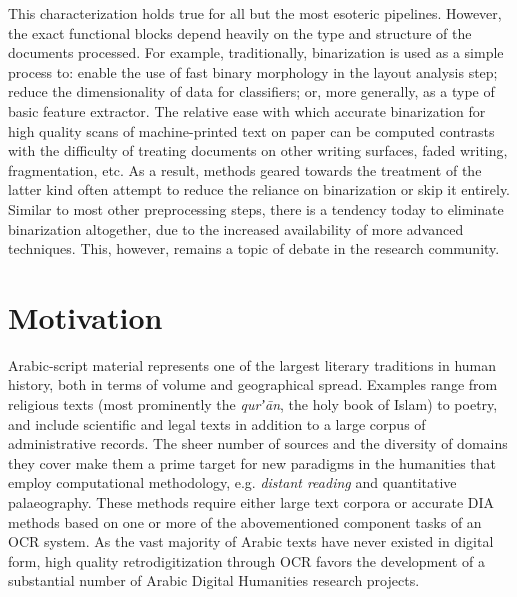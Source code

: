 This characterization holds true for all but the most esoteric pipelines.
However, the exact functional blocks depend heavily on the type and structure
of the documents processed. For example, traditionally, binarization is used as
a simple process to: enable the use of fast binary morphology in the layout
analysis step; reduce the dimensionality of data for classifiers; or, more
generally, as a type of basic feature extractor. The relative ease with which
accurate binarization for high quality scans of machine-printed text on paper
can be computed contrasts with the difficulty of treating documents on other
writing surfaces, faded writing, fragmentation, etc. As a result, methods
geared towards the treatment of the latter kind often attempt to reduce the
reliance on binarization or skip it entirely. Similar to most other
preprocessing steps, there is a tendency today to eliminate binarization
altogether, due to the increased availability of more advanced techniques.
This, however, remains a topic of debate in the research community.

\section{Motivation}

Arabic-script material represents one of the largest literary traditions in
human history, both in terms of volume and geographical spread. Examples range
from religious texts (most prominently the \emph{qurʼān}, the holy book of
Islam) to poetry, and include scientific and legal texts in addition to a large
corpus of administrative records. The sheer number of sources and the diversity
of domains they cover make them a prime target for new paradigms in the
humanities that employ computational methodology, e.g. \emph{distant reading}
and quantitative palaeography. These methods require either large text corpora
or accurate DIA methods based on one or more of the abovementioned component
tasks of an OCR system. As the vast majority of Arabic texts have never existed
in digital form, high quality retrodigitization through OCR favors the
development of a substantial number of Arabic Digital Humanities research
projects.


